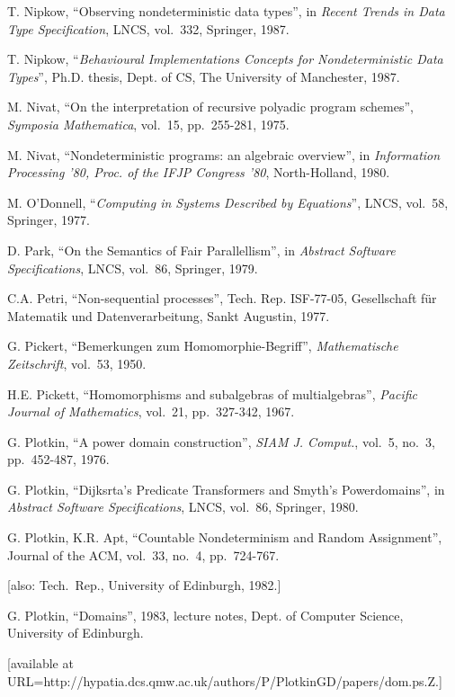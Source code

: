  T. Nipkow, ``Observing nondeterministic data types'', 
in {\em Recent Trends in Data Type Specification}, LNCS, vol.~332, 
Springer, 1987.

 T. Nipkow, ``{\em Behavioural Implementations Concepts 
for Nondeterministic Data Types}'', Ph.D. thesis, Dept.  of CS, The 
University of Manchester, 1987.

 M. Nivat, ``On the interpretation of recursive polyadic 
program schemes'', {\em Symposia Mathematica}, vol.~15, pp.~255-281, 1975.

 M. Nivat, ``Nondeterministic programs: an algebraic 
overview'', in {\em Information Processing '80, Proc.  of the IFJP Congress 
'80}, North-Holland, 1980.

 M. O'Donnell, ``{\em Computing in Systems Described by 
Equations}'', LNCS, vol.~58, Springer, 1977.

 D. Park, ``On the Semantics of Fair Parallellism'', in 
{\em Abstract Software Specifications}, LNCS, vol.~86, Springer, 1979.

 C.A. Petri, ``Non-sequential processes'', Tech.  Rep.  
ISF-77-05, Gesellschaft f\"{u}r Matematik und Datenverarbeitung, Sankt 
Augustin, 1977.

 G. Pickert, ``Bemerkungen zum Homomorphie-Begriff'', 
{\em Mathematische Zeitschrift}, vol.~53, 1950.

 H.E. Pickett, ``Homomorphisms and subalgebras of 
multialgebras'', {\em Pacific Journal of Mathematics}, vol.~21, pp.~327-342, 
1967.

 G. Plotkin, ``A power domain construction'', {\em SIAM 
J. Comput.}, vol.~5, no.~3, pp.~452-487, 1976.

 G. Plotkin, ``Dijksrta's Predicate Transformers and 
Smyth's Powerdomains'', in {\em Abstract Software Specifications}, LNCS, 
vol.~86, Springer, 1980.

 G. Plotkin, K.R. Apt, ``Countable Nondeterminism and 
Random Assignment'', Journal of the ACM, vol.~33, no.~4, pp.~724-767.

{\small{[also: Tech.~Rep., University of Edinburgh, 1982.]}\normalsize}

 G. Plotkin, ``Domains'', 1983, lecture notes, Dept.  
of Computer Science, University of Edinburgh. 

{\small{[available at 
URL=http://hypatia.dcs.qmw.ac.uk/authors/P/PlotkinGD/papers/dom.ps.Z.]}\normalsize}


